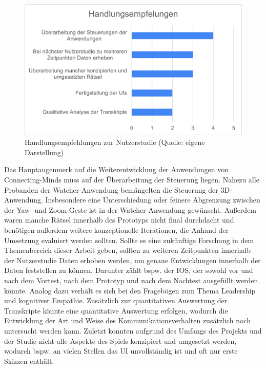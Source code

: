\begin{figure}[ht]
\centering
\includegraphics[width=1\linewidth]{content/pictures/Handlungsempfehlung_Nutzerstudie.png}
\caption{Handlungsempfehlungen zur Nutzerstudie (Quelle: eigene Darstellung)}
\label{fig:call_to_actions_user_study}
\end{figure}

Das Hauptaugenmerk auf die Weiterentwicklung der Anwendungen von Connecting-Minds muss auf der Überarbeitung der Steuerung liegen. Nahezu alle Probanden der Watcher-Anwendung bemängelten die Steuerung der 3D-Anwendung. Insbesondere eine Unterschiedung oder feinere Abgrenzung zwischen der Yaw- und Zoom-Geste ist in der Watcher-Anwendung gewünscht. Außerdem waren manche Rätsel innerhalb des Prototyps nicht final durchdacht und benötigen außerdem weitere konzeptionelle Iterationen, die Anhand der Umsetzung evaluiert werden sollten. 
Sollte es eine zukünftige Forschung in dem Themenbereich dieser Arbeit geben, sollten zu weiteren Zeitpunkten innerhalb der Nutzerstudie Daten erhoben werden, um genaue Entwicklungen innerhalb der Daten feststellen zu können. Darunter zählt bspw. der \ac{IOS}, der sowohl vor und nach dem Vortest, nach dem Prototyp und nach dem Nachtest ausgefüllt werden könnte. Analog dazu verhält es sich bei den Fragebögen zum Thema Leadership und kognitiver Empathie. 
Zusätzlich zur quantitativen Auswertung der Transkripte könnte eine quantitative Auswertung erfolgen, wodurch die Entwicklung der Art und Weise des Kommunikationsverhalten zusätzlich noch untersucht werden kann. Zuletzt konnten aufgrund des Umfangs des Projekts und der Studie nicht alle Aspekte des Spiels konzipiert und umgesetzt werden, wodurch bspw. an vielen Stellen das \ac{UI} unvollständig ist und oft nur erste Skizzen enthält.

